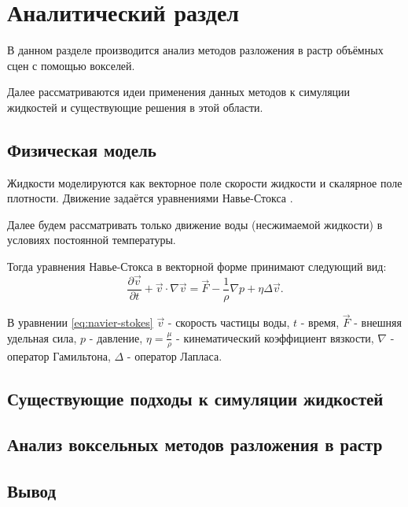 \chapter{Аналитический раздел}
\label{cha:analysis}
%


В данном разделе производится анализ методов разложения в растр объёмных сцен
с помощью вокселей.

Далее рассматриваются идеи применения данных методов к симуляции жидкостей и существующие решения в этой области.


\section{Физическая модель}

Жидкости моделируются как векторное поле скорости жидкости и скалярное поле
плотности. Движение задаётся уравнениями Навье-Стокса \cite{inbook:bigenc}.

Далее будем рассматривать только движение воды (несжимаемой жидкости) в условиях постоянной температуры.

Тогда уравнения Навье-Стокса в векторной форме принимают следующий вид:
\begin{equation}
    \label{eq:navier-stokes}
    \frac{\partial \vec{v}}{\partial t} + \vec{v} \cdot \nabla\vec{v}= \vec{F} - \frac{1}{\rho} \nabla p + \eta\Delta\vec{v}.
\end{equation}

В уравнении \ref{eq:navier-stokes} $\vec{v}$ - скорость частицы воды,
                                   $t$ - время,
                                   ${\vec{F}}$ - внешняя удельная сила,
                                   $p$ - давление,
                                   $\eta = \frac{\mu}{\rho}$ - кинематический коэффициент вязкости,
                                   $\nabla$ - оператор Гамильтона,
                                   $\Delta$ - оператор Лапласа.

\section{Существующие подходы к симуляции жидкостей}



\section{Анализ воксельных методов разложения в растр}



\section{Вывод}


